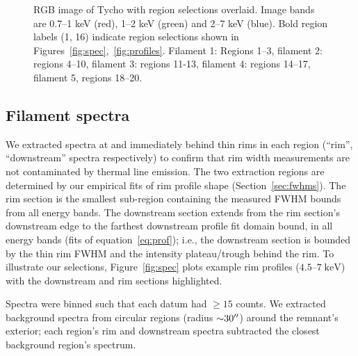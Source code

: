 \documentclass[iop, apj, numberedappendix]{emulateapj}
\newcommand*{\mt}{\mathrm}
\newcommand*{\unit}[1]{\;\mt{#1}}  %
\newcommand*{\abt}{\mathord{\sim}} %
\begin{document}
\begin{figure}
    \centering
    \iftoggle{manuscript}{
        \texttt{[image: figures/snr-inv.png]}
    }{
        \plotone{figures/snr-inv.png}
    }
    \caption{RGB image of Tycho with region selections overlaid.  Image bands
    are 0.7--1 keV (red), 1--2 keV (green) and 2--7 keV (blue).  Bold region
    labels (1, 16) indicate region selections shown in
    Figures~\ref{fig:spec},~\ref{fig:profiles}.  Filament 1: Regions 1--3,
    filament 2: regions 4--10, filament 3: regions 11-13, filament 4:
    regions 14--17, filament 5, regions 18--20.
    \label{fig:snr}}
\end{figure}

\subsection{Filament spectra}
\label{sec:spec}

We extracted spectra at and immediately behind thin rims in each region
(``rim'', ``downstream'' spectra respectively) to confirm that rim width
measurements are not contaminated by thermal line emission.  The two extraction
regions are determined by our empirical fits of rim profile shape
(Section~\ref{sec:fwhms}).  The rim section is the smallest sub-region
containing the measured FWHM bounds from all energy bands.  The downstream
section extends from the rim section's downstream edge to the farthest
downstream profile fit domain bound, in all energy bands (fits of
equation~\eqref{eq:prof}); i.e., the downstream section is bounded by the thin
rim FWHM and the intensity plateau/trough behind the rim.  To illustrate our
selections, Figure~\ref{fig:spec} plots example rim profiles ($4.5$--$7
\unit{keV}$) with the downstream and rim sections highlighted.

Spectra were binned such that each datum had $\geq 15$ counts.  We extracted
background spectra from circular regions (radius $\abt 30\arcsec$) around the
remnant's exterior; each region's rim and downstream spectra subtracted the
closest background region's spectrum.
\end{document}
